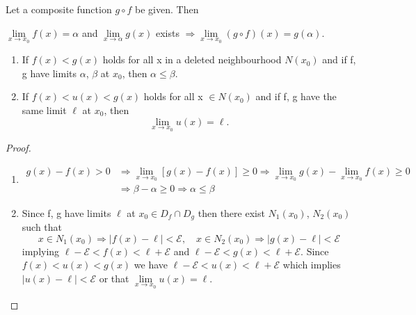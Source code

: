 \documentclass[11pt]{amsbook}
\begin{document}
\begin{cor}
Let a composite function $g \circ f$ be given. Then

$\lim\limits_{x\rightarrow x_{0}} f(x)=\alpha $ and $\lim\limits_{x\rightarrow \alpha} g(x) $ exists  $ \Rightarrow   \lim\limits_{x\rightarrow x_{0}} (g \circ f)(x)=g(\alpha) $.

\end{cor}


\begin{thm}\quad

\begin{enumerate}[label=\arabic*),leftmargin=*,topsep=-10pt,partopsep=0pt,parsep=0pt,itemsep=0pt] 
\item If $f(x)<g(x)$ holds for all x in a deleted neighbourhood $N(x_{0})$ and if f, g have limits $\alpha$, $\beta$ at $x_{0}$, then $\alpha \leq \beta$.
\item If $f(x)<u(x)<g(x)$ holds for all x $\in N(x_{0})$ and if f, g have the same limit $\ell$ at $x_{0}$, then 
\[ \lim_{x\rightarrow x_{0}} u(x) = \ell . \]
\end{enumerate} 
\end{thm}


\begin{proof}\quad

\begin{enumerate}[label=\arabic*),leftmargin=*,topsep=-10pt,partopsep=0pt,parsep=0pt,itemsep=0pt]
\item 
\begin{align*}
g(x)-f(x)>0 & \Rightarrow  \lim\limits_{x\rightarrow x_{0}} [g(x)-f(x)]\geq 0 
\Rightarrow \lim\limits_{x\rightarrow x_{0}} g(x) - \lim\limits_{x\rightarrow x_{0}} f(x)\geq 0 \\
&\Rightarrow \beta - \alpha \geq 0 
\Rightarrow \alpha \leq \beta 
\end{align*}

\item Since f, g have limits $\ell$ at $x_{0} \in D_{f} \cap D_{g}$ then there exist $N_{1}(x_{0})$, $N_{2}(x_{0})$ such that
\[ x \in N_{1}(x_{0}) \Rightarrow |f(x) -\ell| < \mathcal{E} ,\quad x \in N_{2}(x_{0}) \Rightarrow |g(x) -\ell| < \mathcal{E} \]
implying $\ell-\mathcal{E} < f(x)<\ell+\mathcal{E} $ and $\ell-\mathcal{E} < g(x)<\ell+\mathcal{E} $. Since  $f(x)<u(x)<g(x)$ we have $\ell-\mathcal{E} < u(x)<\ell+\mathcal{E} $ which implies $|u(x) -\ell| < \mathcal{E}$ or that $\lim\limits_{x\rightarrow x_{0}} u(x)=\ell$.

\end{enumerate} 
\end{proof}
\end{document}
